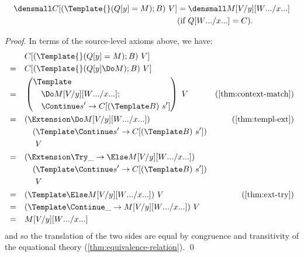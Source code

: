 \begin{lemma}
  \label{thm:context-exact-match}
  \begin{align*}
    \den{C[(\Template{} (Q[y] = M); B) ~ V]}
    &=
    \den{M\subst{y}{V}\subst{\many{x}}{\many{W}}}
    \\
    &(\text{if } Q\subst{\many{x}}{\many{W}} = C)
    .
  \end{align*}
\end{lemma}
\begin{proof}
  In terms of the source-level axioms above, we have:
  \begin{align*}
    &\quad
    C[(\Template{} (Q[y] = M); B) ~ V]
    \\
    =&\quad
    C[(\Template{} (Q[y] \Do M); B) ~ V]
    \\
    =&\quad
    \left(
      \begin{aligned}
        &\Template \\
        &\quad \Do M\subst{y}{V}\subst{\many{x}}{\many{W}}; \\
        &\quad \Continue s' \to C[(\Template B) ~ s']
      \end{aligned}
    \right)
    ~ V
    &(\cref{thm:context-match})
    \\
    =&\quad
    \begin{aligned}[t]
      &(\Extension \Do M\subst{y}{V}\subst{\many{x}}{\many{W}}) \\
      &\quad (\Template \Continue s' \to C[(\Template B) ~ s']) \\
      &\quad ~ V
    \end{aligned}
    &(\cref{thm:templ-ext})
    \\
    =&\quad
    \begin{aligned}[t]
      &(\Extension \Try \_ \to \Else M\subst{y}{V}\subst{\many{x}}{\many{W}}) \\
      &\quad (\Template \Continue s' \to C[(\Template B) ~ s']) \\
      &\quad ~ V
    \end{aligned}
    \\
    =&\quad
    (\Template \Else M\subst{y}{V}\subst{\many{x}}{\many{W}}) ~ V
    &(\cref{thm:ext-try})
    \\
    =&\quad
    (\Template \Continue \_ \to  M\subst{y}{V}\subst{\many{x}}{\many{W}}) ~ V
    \\
    =&\quad
    M\subst{y}{V}\subst{\many{x}}{\many{W}}
  \end{align*}
  and so the translation of the two sides are equal by congruence and transitivity of the equational theory (\cref{thm:equivalence-relation}).
  \qed
  

\end{proof}
